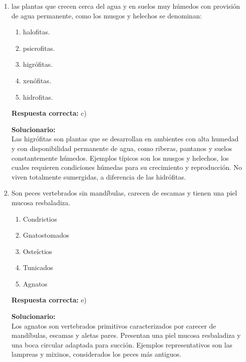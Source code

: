 	\begin{enumerate}
		
		\item las plantas que crecen cerca del agua y en suelos muy húmedos con provisión de agua permanente, como los musgos y helechos se denominan:
		
		\begin{enumerate}[label=\alph*)]
			\item halofitas.
			\item psicrofitas.
			\item higrófitas.
			\item xenófitas.
			\item hidrofitas.
		\end{enumerate}
		
		\textbf{Respuesta correcta:} c)
		
	\vspace{2mm}
	\textbf{Solucionario:}\\
	
	Las higrófitas son plantas que se desarrollan en ambientes con alta humedad y con disponibilidad permanente de agua, como riberas, pantanos y suelos constantemente húmedos. Ejemplos típicos son los musgos y helechos, los cuales requieren condiciones húmedas para su crecimiento y reproducción.
	No viven totalmente sumergidas, a diferencia de las hidrófitas.
		
		\vspace{6mm}
		
		\item Son peces vertebrados sin mandíbulas, carecen de escamas y tienen una piel mucosa resbaladiza.
		\begin{enumerate}[label=\alph*)]
			\item Condrictios
			\item Gnatostomados
			\item Osteíctios
			\item Tunicados
			\item Agnatos
		\end{enumerate}
		
		\textbf{Respuesta correcta:} e)
		
			\vspace{2mm}
		\textbf{Solucionario:}\\
		
		Los agnatos son vertebrados primitivos caracterizados por carecer de mandíbulas, escamas y aletas pares. Presentan una piel mucosa resbaladiza y una boca circular adaptada para succión. Ejemplos representativos son las lampreas y mixinos, considerados los peces más antiguos.
		
		\vspace{6mm}
		
	\end{enumerate}
	

